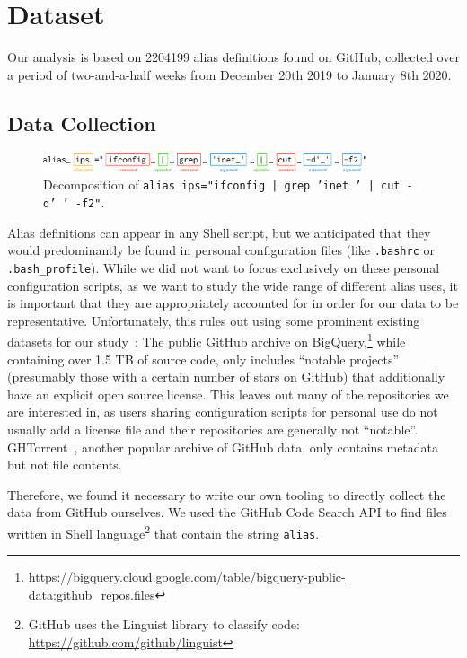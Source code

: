 \section{Dataset}

Our analysis is based on \num{2204199} alias definitions found on GitHub, collected over a period of two-and-a-half weeks from December 20th 2019 to January 8th 2020.

\subsection{Data Collection}

\begin{figure}
	\centering
	\includegraphics[width=0.85\textwidth]{graphics/parser_breakdown.pdf}
	\caption{Decomposition of \texttt{alias ips="ifconfig | grep 'inet ' | cut -d' ' -f2"}.}
	\label{fig:parser}
\end{figure}

Alias definitions can appear in any Shell script, but we anticipated that they would predominantly be found in personal configuration files (like \verb|.bashrc| or \verb|.bash_profile|).
While we did not want to focus exclusively on these personal configuration scripts, as we want to study the wide range of different alias uses, it is important that they are appropriately accounted for in order for our data to be representative.
Unfortunately, this rules out using some prominent existing datasets for our study~\cite{mombach}:
The public GitHub archive on BigQuery,\footnote{\url{https://bigquery.cloud.google.com/table/bigquery-public-data:github_repos.files}} while containing over 1.5 TB of source code, only includes ``notable projects'' (presumably those with a certain number of stars on GitHub) that additionally have an explicit open source license. 
This leaves out many of the repositories we are interested in, as users sharing configuration scripts for personal use do not usually add a license file and their repositories are generally not ``notable''.
GHTorrent~\cite{ghtorrent}, another popular archive of GitHub data, only contains metadata but not file contents.

Therefore, we found it necessary to write our own tooling to directly collect the data from GitHub ourselves.
We used the GitHub Code Search API to find files written in Shell language\footnote{GitHub uses the Linguist library to classify code: \url{https://github.com/github/linguist}} that contain the string \verb|alias|.

